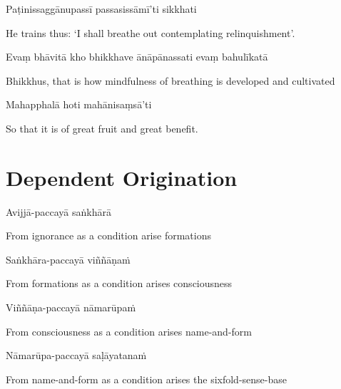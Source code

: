 Paṭinissaggānupassī passasissāmī'ti sikkhati

\begin{english}
  He trains thus: `I shall breathe out contemplating relinquishment'.
\end{english}

Evaṃ bhāvitā kho bhikkhave ānāpānassati evaṃ bahulīkatā

\begin{english}
  Bhikkhus, that is how mindfulness of breathing is developed and cultivated
\end{english}

Mahapphalā hoti mahānisaṃsā'ti

\begin{english}
  So that it is of great fruit and great benefit.
\end{english}


\clearpage

\section*{Dependent Origination}

\begin{leader}
\end{leader}
\begin{leader}
\end{leader}

Avijjā-paccayā saṅkhārā

\begin{cprenglish}
From ignorance as a condition arise formations
\end{cprenglish}

Saṅkhāra-paccayā viññāṇaṁ

\begin{cprenglish}
From formations as a condition arises consciousness
\end{cprenglish}

Viññāṇa-paccayā nāmarūpaṁ

\begin{cprenglish}
From consciousness as a condition arises name-and-form
\end{cprenglish}

Nāmarūpa-paccayā saḷāyatanaṁ

\begin{cprenglish}
From name-and-form as a condition arises the sixfold-sense-base
\end{cprenglish}

